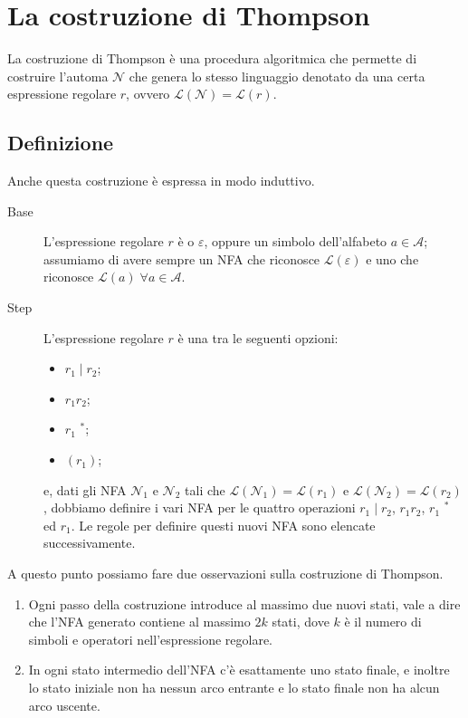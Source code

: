 \documentclass[class=book, crop=false, oneside, 12pt]{standalone}
\begin{document}
\section{La costruzione di Thompson}
La costruzione di Thompson è una procedura algoritmica che permette di costruire l’automa \(\mathcal{N}\) che genera lo stesso linguaggio denotato da una certa espressione regolare \(r\), ovvero \(\mathcal{L}(\mathcal{N}) = \mathcal{L}(r)\).

\subsection{Definizione}
Anche questa costruzione è espressa in modo induttivo.

\begin{description}
    \item[Base] L'espressione regolare \(r\) è o \(\varepsilon\), oppure un simbolo dell’alfabeto \(a \in \mathcal{A}\); assumiamo di avere sempre un NFA che riconosce \(\mathcal{L}(\varepsilon)\) e uno che riconosce \(\mathcal{L}(a) \; \forall a \in \mathcal{A}\).
    \item[Step] L'espressione regolare \(r\) è una tra le seguenti opzioni: 
    \begin{itemize}[noitemsep]
        \item \(r_1 \mid  r_2 \);
        \item \( r_1 r_2 \); 
        \item \( r_1\) \(^\ast \);
        \item \((r_1)\);
    \end{itemize}
    e, dati gli NFA \(\mathcal{N}_1\) e \(\mathcal{N}_2\) tali che \(\mathcal{L}(\mathcal{N}_1)=\mathcal{L}(r_1)\) e \(\mathcal{L}(\mathcal{N}_2) = \mathcal{L}(r_2)\), dobbiamo definire i vari NFA per le quattro operazioni \(r_1 \mid r_2\), \(r_1 r_2\), \(r_1\) \(^\ast\) ed \(r_1\). Le regole per definire questi nuovi NFA sono elencate successivamente.
\end{description}

\noindent A questo punto possiamo fare due osservazioni sulla costruzione di Thompson.

\begin{enumerate}
    \item Ogni passo della costruzione introduce al massimo due nuovi stati, vale a dire che l’NFA generato contiene al massimo \(2k\) stati, dove \(k\) è il numero di simboli e operatori nell’espressione regolare.
    \item In ogni stato intermedio dell’NFA c’è esattamente uno stato finale, e inoltre lo stato iniziale non ha nessun arco entrante e lo stato finale non ha alcun arco uscente. 
\end{enumerate}
\end{document}
